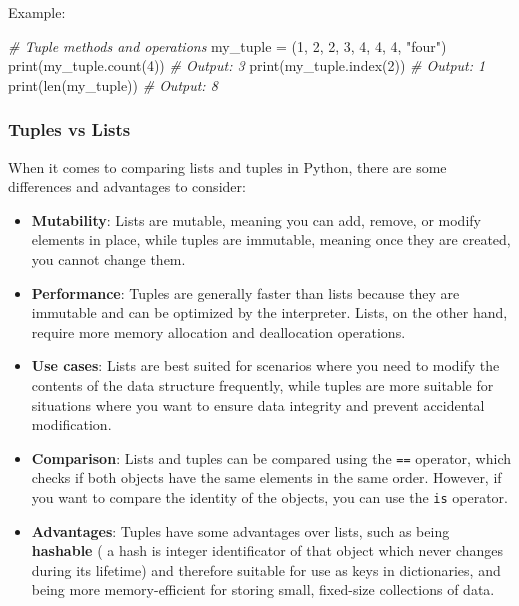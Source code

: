 \documentclass[11pt]{article}
\newenvironment{Shaded}{}{}
\newcommand{\DecValTok}[1]{\textcolor[rgb]{0.25,0.63,0.44}{{#1}}}
\newcommand{\StringTok}[1]{\textcolor[rgb]{0.25,0.44,0.63}{{#1}}}
\newcommand{\CommentTok}[1]{\textcolor[rgb]{0.38,0.63,0.69}{\textit{{#1}}}}
\newcommand{\NormalTok}[1]{{#1}}
\newcommand{\OperatorTok}[1]{\textcolor[rgb]{0.40,0.40,0.40}{{#1}}}
\newcommand{\BuiltInTok}[1]{{#1}}
\begin{document}
Example:

\begin{Shaded}
\begin{Highlighting}[]
\CommentTok{\# Tuple methods and operations}
\NormalTok{my\_tuple }\OperatorTok{=}\NormalTok{ (}\DecValTok{1}\NormalTok{, }\DecValTok{2}\NormalTok{, }\DecValTok{2}\NormalTok{, }\DecValTok{3}\NormalTok{, }\DecValTok{4}\NormalTok{, }\DecValTok{4}\NormalTok{, }\DecValTok{4}\NormalTok{, }\StringTok{"four"}\NormalTok{)}
\BuiltInTok{print}\NormalTok{(my\_tuple.count(}\DecValTok{4}\NormalTok{))  }\CommentTok{\# Output: 3}
\BuiltInTok{print}\NormalTok{(my\_tuple.index(}\DecValTok{2}\NormalTok{))  }\CommentTok{\# Output: 1}
\BuiltInTok{print}\NormalTok{(}\BuiltInTok{len}\NormalTok{(my\_tuple))  }\CommentTok{\# Output: 8}
\end{Highlighting}
\end{Shaded}

\hypertarget{tuples-vs-lists}{%
\subsubsection{Tuples vs Lists}\label{tuples-vs-lists}}

When it comes to comparing lists and tuples in Python, there are some
differences and advantages to consider:

\begin{itemize}
\item
  \textbf{Mutability}: Lists are mutable, meaning you can add, remove,
  or modify elements in place, while tuples are immutable, meaning once
  they are created, you cannot change them.
\item
  \textbf{Performance}: Tuples are generally faster than lists because
  they are immutable and can be optimized by the interpreter. Lists, on
  the other hand, require more memory allocation and deallocation
  operations.
\item
  \textbf{Use cases}: Lists are best suited for scenarios where you need
  to modify the contents of the data structure frequently, while tuples
  are more suitable for situations where you want to ensure data
  integrity and prevent accidental modification.
\item
  \textbf{Comparison}: Lists and tuples can be compared using the
  \texttt{==} operator, which checks if both objects have the same
  elements in the same order. However, if you want to compare the
  identity of the objects, you can use the \texttt{is} operator.
\item
  \textbf{Advantages}: Tuples have some advantages over lists, such as
  being \textbf{hashable} ( a hash is integer identificator of that
  object which never changes during its lifetime) and therefore suitable
  for use as keys in dictionaries, and being more memory-efficient for
  storing small, fixed-size collections of data.
\end{itemize}
\end{document}
